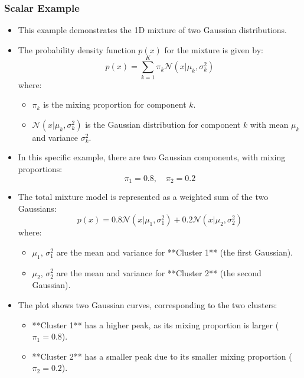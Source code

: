 \subsubsection{Scalar Example}
\begin{example}
    \begin{itemize}
        \item This example demonstrates the 1D mixture of two Gaussian distributions.
        
        \item The probability density function \( p(x) \) for the mixture is given by:
        \[
        p(x) = \sum_{k=1}^{K} \pi_k \mathcal{N}(x | \mu_k, \sigma_k^2)
        \]
        where:
        \begin{itemize}
            \item \( \pi_k \) is the mixing proportion for component \( k \).
            \item \( \mathcal{N}(x | \mu_k, \sigma_k^2) \) is the Gaussian distribution for component \( k \) with mean \( \mu_k \) and variance \( \sigma_k^2 \).
        \end{itemize}
        
        \item In this specific example, there are two Gaussian components, with mixing proportions:
        \[
        \pi_1 = 0.8, \quad \pi_2 = 0.2
        \]
        
        \item The total mixture model is represented as a weighted sum of the two Gaussians:
        \[
        p(x) = 0.8 \mathcal{N}(x | \mu_1, \sigma_1^2) + 0.2 \mathcal{N}(x | \mu_2, \sigma_2^2)
        \]
        where:
        \begin{itemize}
            \item \( \mu_1 \), \( \sigma_1^2 \) are the mean and variance for **Cluster 1** (the first Gaussian).
            \item \( \mu_2 \), \( \sigma_2^2 \) are the mean and variance for **Cluster 2** (the second Gaussian).
        \end{itemize}
        
        \item The plot shows two Gaussian curves, corresponding to the two clusters:
        \begin{itemize}
            \item **Cluster 1** has a higher peak, as its mixing proportion is larger (\( \pi_1 = 0.8 \)).
            \item **Cluster 2** has a smaller peak due to its smaller mixing proportion (\( \pi_2 = 0.2 \)).
        \end{itemize}
        

\end{itemize}
\end{example}
